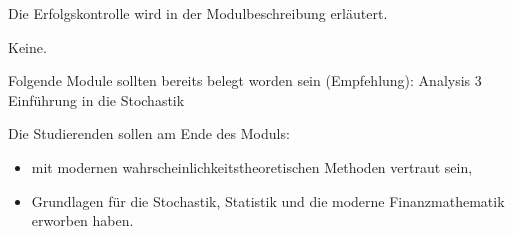 \begin{course}

\setdoclanguagegerman
{}


\courselevel{}
\courseinstructionlanguage{}

\coursehead


\label{cour_8039.dp_997}


\begin{styleenv}
\begin{assessment}
Die Erfolgskontrolle wird in der Modulbeschreibung erläutert.


\end{assessment}

\begin{conditions}Keine.\end{conditions}

\begin{recommendations}Folgende Module sollten bereits belegt worden sein (Empfehlung):\newline
Analysis 3\newline
Einführung in die Stochastik

\end{recommendations}
\end{styleenv}

\begin{learningoutcomes}
Die Studierenden sollen am Ende des Moduls:

 \begin{itemize}\item mit modernen wahrscheinlichkeitstheoretischen Methoden vertraut sein,  \item Grundlagen für die Stochastik, Statistik und die moderne Finanzmathematik erworben haben.  \end{itemize}
\end{learningoutcomes}


\end{course}
